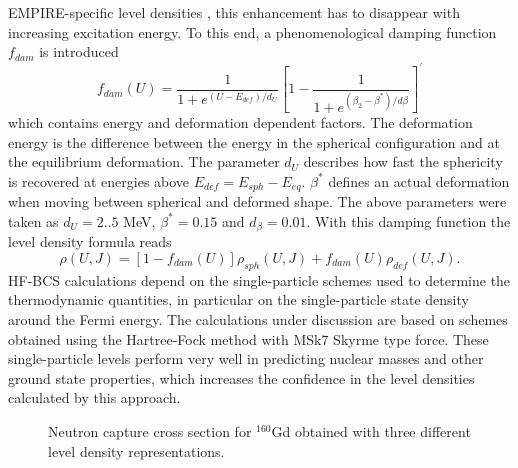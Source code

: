 EMPIRE-specific level densities%
, this enhancement has to disappear with increasing
excitation energy. To this end, a phenomenological damping function $f_{dam}$
is introduced 
\begin{equation}
f_{dam}(U)=%
\frac{1}{1+e^{(U-E_{def})/d_{U}}}\left[1-\frac{1}{1+e^{(\beta_{2}-%
\beta^{*})/d\beta}}\right]^{\prime}  \label{dampgor}
\end{equation}
which contains energy and deformation dependent factors. The deformation
energy is the difference between the energy in the spherical configuration
and at the equilibrium deformation. The parameter $d_{U}$ describes how fast
the sphericity is recovered at energies above $E_{def}=E_{sph}-E_{eq}$. $%
\beta^{*}$ defines an actual deformation when moving between spherical and
deformed shape. The above parameters were taken as $d_{U}=2..5$ MeV, $%
\beta^{*}=0.15$ and $d_{\beta}=0.01$. With this damping function the level
density%
 formula reads 
\begin{equation}
\rho(U,J)=\left[1-f_{dam}(U)\right]\rho_{sph}(U,J)+f_{dam}(U)\rho_{def}(U,J).
\label{rogor}
\end{equation}
HF-BCS%
 calculations depend on the single-particle schemes used to
determine the thermodynamic quantities, in particular on the single-particle
state density around the Fermi energy. The calculations under discussion are
based on schemes obtained using the Hartree-Fock method with MSk7 Skyrme
type force. These single-particle levels perform very well in predicting
nuclear masses and other ground state properties, which increases the
confidence in the level densities%
 calculated by this approach. 
\begin{figure}[htbp]
\caption{Neutron capture cross section for $^{160}$Gd obtained with three
different level density representations.}
\label{levdens}
\end{figure}

